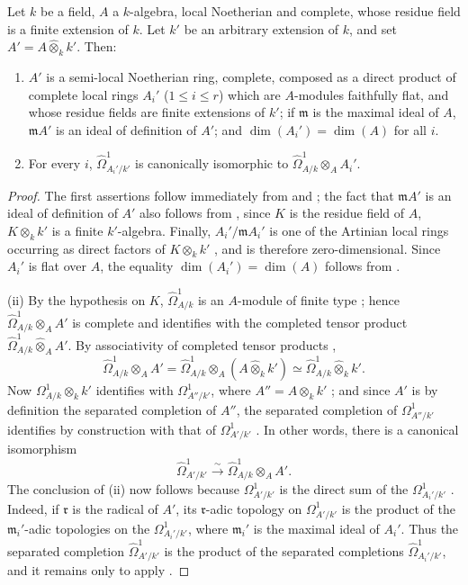 \begin{lemma}[18.11.4]
\label{IV.18.11.4}
Let $k$ be a field, $A$ a $k$-algebra, local Noetherian and complete, whose residue field is a finite extension of $k$.
Let $k'$ be an arbitrary extension of $k$, and set $A'=A\widehat{\otimes}_kk'$.
Then:
\begin{enumerate}[label=\textup{(\roman*)}]
  \item $A'$ is a semi-local Noetherian ring, complete, composed as a direct product of complete local rings $A_i'$ \textup{($1\leq i\leq r$)} which are $A$-modules faithfully flat, and whose residue fields are finite extensions of $k'$; if $\mathfrak{m}$ is the maximal ideal of $A$, $\mathfrak{m}A'$ is an ideal of definition of $A'$; and $\dim(A_i')=\dim(A)$ for all $i$.
  \item For every $i$, $\hat{\Omega}^1_{A_i'/k'}$ is canonically isomorphic to $\hat{\Omega}^1_{A/k}\otimes_{A}A_i'$.
\end{enumerate}
\end{lemma}

\begin{proof}
The first assertions follow immediately from  and ; the fact that $\mathfrak{m}A'$ is an ideal of definition of $A'$ also follows from , since $K$ is the residue field of $A$, $K\otimes_k k'$ is a finite $k'$-algebra.
Finally, $A_i'/\mathfrak{m}A_i'$ is one of the Artinian local rings occurring as direct factors of $K\otimes_k k'$ , and is therefore zero-dimensional. Since $A_i'$ is flat over $A$, the equality $\dim(A_i')=\dim(A)$ follows from .

(ii) By the hypothesis on $K$, $\hat{\Omega}^1_{A/k}$ is an $A$-module of finite type ; hence $\hat{\Omega}^1_{A/k}\otimes_{A}A'$ is complete and identifies with the completed tensor product $\hat{\Omega}^1_{A/k}\widehat{\otimes}_{A}A'$. By associativity of completed tensor products ,
\[
  \hat{\Omega}^1_{A/k}\otimes_{A}A'
  =\hat{\Omega}^1_{A/k}\otimes_{A}(A\widehat{\otimes}_kk')
  \simeq\hat{\Omega}^1_{A/k}\widehat{\otimes}_kk'.
\]
Now $\Omega^1_{A/k}\otimes_kk'$ identifies with $\Omega^1_{A''/k'}$, where $A''=A\otimes_kk'$ ; and since $A'$ is by definition the separated completion of $A''$, the separated completion of $\Omega^1_{A''/k'}$ identifies by construction with that of $\Omega^1_{A'/k'}$ . In other words, there is a canonical isomorphism
\[
  \hat{\Omega}^1_{A'/k'}\xrightarrow{\sim}
  \hat{\Omega}^1_{A/k}\otimes_{A}A'.
\]
The conclusion of (ii) now follows because $\Omega^1_{A'/k'}$ is the direct sum of the $\Omega^1_{A_i'/k'}$ . Indeed, if $\mathfrak r$ is the radical of $A'$, its $\mathfrak r$-adic topology on $\Omega^1_{A'/k'}$ is the product of the $\mathfrak m_i'$-adic topologies on the $\Omega^1_{A_i'/k'}$, where $\mathfrak m_i'$ is the maximal ideal of $A_i'$. Thus the separated completion $\hat{\Omega}^1_{A'/k'}$ is the product of the separated completions $\hat{\Omega}^1_{A_i'/k'}$, and it remains only to apply .
\end{proof}

